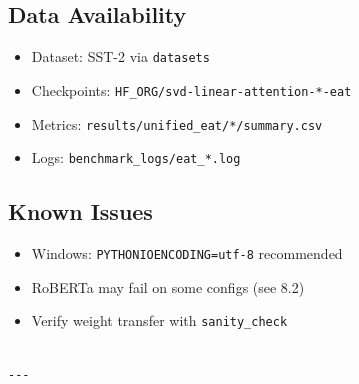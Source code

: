 \subsection{Data Availability}

\begin{itemize}
\item Dataset: SST-2 via \texttt{datasets}
\item Checkpoints: \texttt{{{HF\_ORG}}/svd-linear-attention-*-eat}
\item Metrics: \texttt{results/unified\_eat/*/summary.csv}
\item Logs: \texttt{benchmark\_logs/eat\_*.log}

\end{itemize}
\subsection{Known Issues}

\begin{itemize}
\item Windows: \texttt{PYTHONIOENCODING=utf-8} recommended
\item RoBERTa may fail on some configs (see  8.2)
\item Verify weight transfer with \texttt{sanity\_check}
\end{itemize}
\begin{lstlisting}

---
\end{lstlisting}